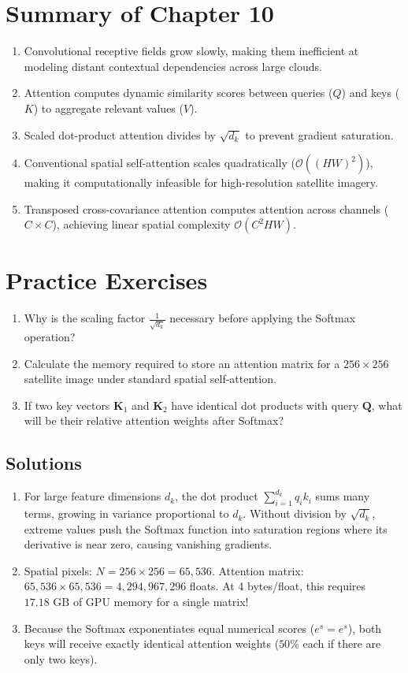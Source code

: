 \section{Summary of Chapter 10}
\begin{enumerate}
    \item Convolutional receptive fields grow slowly, making them inefficient at modeling distant contextual dependencies across large clouds.
    \item Attention computes dynamic similarity scores between queries ($Q$) and keys ($K$) to aggregate relevant values ($V$).
    \item Scaled dot-product attention divides by $\sqrt{d_k}$ to prevent gradient saturation.
    \item Conventional spatial self-attention scales quadratically ($\mathcal{O}((HW)^2)$), making it computationally infeasible for high-resolution satellite imagery.
    \item Transposed cross-covariance attention computes attention across channels ($C \times C$), achieving linear spatial complexity $\mathcal{O}(C^2 HW)$.
\end{enumerate}

\section{Practice Exercises}
\begin{enumerate}
    \item Why is the scaling factor $\frac{1}{\sqrt{d_k}}$ necessary before applying the Softmax operation?
    \item Calculate the memory required to store an attention matrix for a $256 \times 256$ satellite image under standard spatial self-attention.
    \item If two key vectors $\mathbf{K}_1$ and $\mathbf{K}_2$ have identical dot products with query $\mathbf{Q}$, what will be their relative attention weights after Softmax?
\end{enumerate}

\subsection*{Solutions}
\begin{enumerate}
    \item For large feature dimensions $d_k$, the dot product $\sum_{i=1}^{d_k} q_i k_i$ sums many terms, growing in variance proportional to $d_k$. Without division by $\sqrt{d_k}$, extreme values push the Softmax function into saturation regions where its derivative is near zero, causing vanishing gradients.
    \item Spatial pixels: $N = 256 \times 256 = 65{,}536$. Attention matrix: $65{,}536 \times 65{,}536 = 4{,}294{,}967{,}296$ floats. At 4 bytes/float, this requires $17.18\text{ GB}$ of GPU memory for a single matrix!
    \item Because the Softmax exponentiates equal numerical scores ($e^s = e^s$), both keys will receive exactly identical attention weights ($50\%$ each if there are only two keys).
\end{enumerate}
